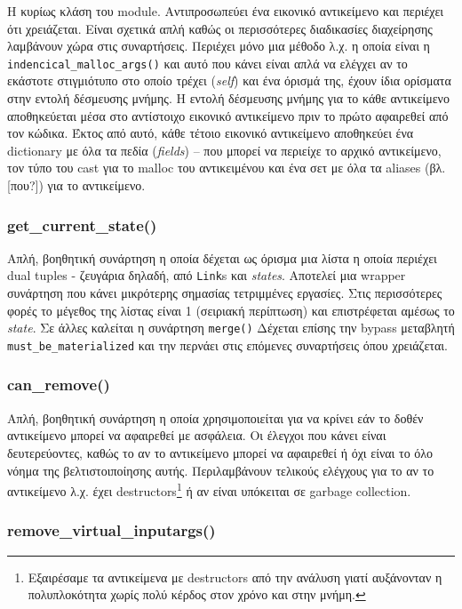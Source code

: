 Η κυρίως κλάση του module. Αντιπροσωπεύει ένα εικονικό αντικείμενο και περιέχει
ότι χρειάζεται. Είναι σχετικά απλή καθώς οι περισσότερες διαδικασίες διαχείρησης
λαμβάνουν χώρα στις συναρτήσεις. Περιέχει μόνο μια μέθοδο λ.χ. η οποία είναι η
\texttt{indencical\_malloc\_args()} και αυτό που κάνει είναι απλά να ελέγχει αν το
εκάστοτε στιγμιότυπο στο οποίο τρέχει (\textit{self}) και ένα όρισμά της, έχουν
ίδια ορίσματα στην εντολή δέσμευσης μνήμης. Η εντολή δέσμευσης μνήμης για το
κάθε αντικείμενο αποθηκεύεται μέσα στο αντίστοιχο εικονικό αντικείμενο πριν το
πρώτο αφαιρεθεί από τον κώδικα. Έκτος από αυτό, κάθε τέτοιο εικονικό αντικείμενο
αποθηκεύει ένα dictionary με όλα τα πεδία (\textit{fields}) – που μπορεί να
περιείχε το αρχικό αντικείμενο, τον τύπο του cast για το malloc του
αντικειμένου και ένα σετ με όλα τα aliases (βλ. [που?]) για το αντικείμενο.

\subsubsection{get\_current\_state()}

Απλή, βοηθητική συνάρτηση η οποία δέχεται ως όρισμα μια λίστα η οποία περιέχει
dual tuples - ζευγάρια δηλαδή, από \texttt{Link}s και \textit{states}. Αποτελεί
μια wrapper συνάρτηση που κάνει μικρότερης σημασίας τετριμμένες εργασίες. Στις
περισσότερες φορές το μέγεθος της λίστας είναι 1 (σειριακή περίπτωση) και
επιστρέφεται αμέσως το \textit{state}. Σε άλλες καλείται η συνάρτηση
\texttt{merge()} Δέχεται επίσης την bypass μεταβλητή
\texttt{must\_be\_materialized} και την περνάει στις επόμενες συναρτήσεις όπου
χρειάζεται.

\subsubsection{can\_remove()}

Απλή, βοηθητική συνάρτηση η οποία χρησιμοποιείται για να κρίνει εάν το δοθέν
αντικείμενο μπορεί να αφαιρεθεί με ασφάλεια. Οι έλεγχοι που κάνει είναι
δευτερεύοντες, καθώς το αν το αντικείμενο μπορεί να αφαιρεθεί ή όχι είναι το όλο
νόημα της βελτιστοιποίησης αυτής. Περιλαμβάνουν τελικούς ελέγχους για το αν το
αντικείμενο λ.χ. έχει destructors\footnote{Εξαιρέσαμε τα αντικείμενα με
destructors από την ανάλυση γιατί αυξάνονταν η πολυπλοκότητα χωρίς πολύ κέρδος
στον χρόνο και στην μνήμη.} ή αν είναι υπόκειται σε garbage collection.

\subsubsection{remove\_virtual\_inputargs()}

